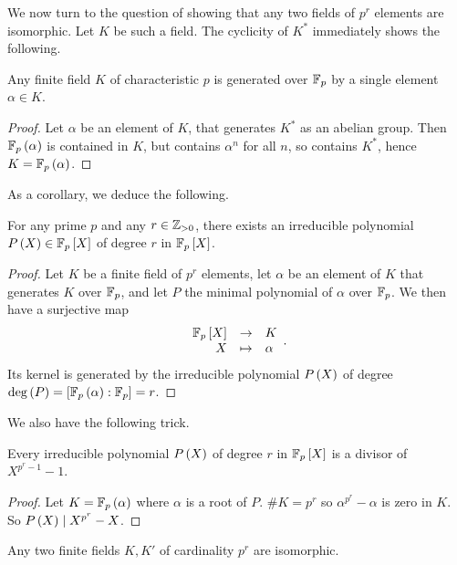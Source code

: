 We now turn to the question of showing that any two fields of $ p^r $ elements are isomorphic. Let $ K $ be such a field. The cyclicity of $ K^* $ immediately shows the following.

\begin{proposition}
Any finite field $ K $ of characteristic $ p $ is generated over $ \mathbb{F}_p $ by a single element $ \alpha \in K $.
\end{proposition}

\begin{proof}
Let $ \alpha $ be an element of $ K $, that generates $ K^* $ as an abelian group. Then $ \mathbb{F}_p\left( \alpha \right) $ is contained in $ K $, but contains $ \alpha^n $ for all $ n $, so contains $ K^* $, hence $ K = \mathbb{F}_p\left( \alpha \right) $.
\end{proof}

As a corollary, we deduce the following.

\begin{proposition}
For any prime $ p $ and any $ r \in \mathbb{Z}_{> 0} $, there exists an irreducible polynomial $ P\left( X \right) \in \mathbb{F}_p\left[ X \right] $ of degree $ r $ in $ \mathbb{F}_p\left[ X \right] $.
\end{proposition}

\begin{proof}
Let $ K $ be a finite field of $ p^r $ elements, let $ \alpha $ be an element of $ K $ that generates $ K $ over $ \mathbb{F}_p $, and let $ P $ the minimal polynomial of $ \alpha $ over $ \mathbb{F}_p $. We then have a surjective map
$$ \function{\F_p\sb{X}}{K}{X}{\alpha}. $$
Its kernel is generated by the irreducible polynomial $ P\left( X \right) $ of degree $ \deg\left( P \right) = \left[ \mathbb{F}_p\left( \alpha \right) : \mathbb{F}_p \right] = r $.
\end{proof}

We also have the following trick.

\begin{lemma}
Every irreducible polynomial $ P\left( X \right) $ of degree $ r $ in $ \mathbb{F}_p\left[ X \right] $ is a divisor of $ X^{p^r - 1} - 1 $.
\end{lemma}

\begin{proof}
Let $ K = \mathbb{F}_p\left( \alpha \right) $ where $ \alpha $ is a root of $ P $. $ \#K = p^r $ so $ \alpha^{p^r} - \alpha $ is zero in $ K $. So $ P\left( X \right) \mid X^{p^r} - X $.
\end{proof}

\begin{corollary}
Any two finite fields $ K, K' $ of cardinality $ p^r $ are isomorphic.
\end{corollary}

